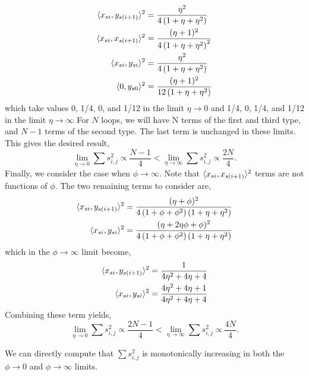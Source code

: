 \[
\begin{aligned}
\langle x_{si}, y_{s(i+1)} \rangle^2 &=\frac{\eta^2}{4 \left(1+\eta+\eta^2\right)}\\
\langle x_{si}, x_{s(i+1)}\rangle^2 &=\frac{(\eta+1)^2}{4 \left(1+\eta+\eta^2\right)^2}\\
\langle x_{si}, y_{si}\rangle^2 &=\frac{\eta^2}{4 \left(1+\eta+\eta^2\right)}\\
\langle 0, y_{s0} \rangle^2 &=\frac{(\eta+1)^2}{12 \left(1+\eta+\eta^2\right)}\\
\end{aligned}
\]
which take values 0, 1/4, 0, and 1/12 in the limit $\eta\to0$ and 1/4, 0, 1/4, and 1/12 in the limit $\eta\to\infty$ For $N$ loops, we will have N terms of the first and third type, and $N-1$ terms of the second type.  The last term is unchanged in these limits.  This gives the desired result, 
\[
\lim_{\eta\to 0}\sum s^2_{i,j} \propto \frac{N-1}{4}<\lim_{\eta\to\infty}\sum s^2_{i,j} \propto \frac{2N}{4}.
\]
Finally, we consider the case when $\phi\to\infty$.  Note that $\langle x_{si}, x_{s(i+1)}\rangle^2$ terms are not functions of $\phi$.  The two remaining terms to consider are,
\[
\begin{aligned}
 \langle x_{si}, y_{s(i+1)} \rangle^2 &=\frac{(\eta+\phi)^2}{4 \left(1+ \phi+\phi^2\right) \left(1+\eta+\eta^2\right)}\\
 \langle x_{si}, y_{si}\rangle^2 &=\frac{(\eta+2 \eta \phi+ \phi)^2}{4 \left(1+\phi+\phi^2\right) \left(1+\eta+\eta^2\right)}\\
 \end{aligned}
\]
which in the $\phi\to\infty$ limit become,
\[
\begin{aligned}
 \langle x_{si}, y_{s(i+1)} \rangle^2 &=\frac{1}{4 \eta ^2+4 \eta +4}\\
 \langle x_{si}, y_{si}\rangle^2 &=\frac{4 \eta ^2+4 \eta +1}{4 \eta ^2+4 \eta +4}\\
 \end{aligned}
\]
Combining these term yields,
\[
\lim_{\eta\to 0}\sum s^2_{i,j} \propto \frac{2N-1}{4}<\lim_{\eta\to\infty}\sum s^2_{i,j} \propto \frac{4N}{4}.
\]

We can directly compute that $\sum s^2_{i,j} $ is monotonically increasing in both the $\phi\to0$ and $\phi\to\infty$ limits.



